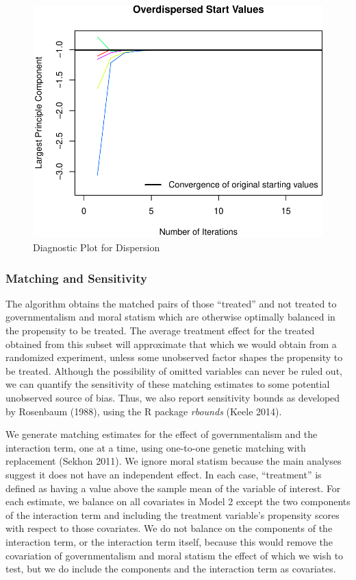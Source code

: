 \documentclass[12pt,]{article}
\begin{document}
\begin{figure}[htbp]
\centering
\includegraphics{figures/missing6-1.pdf}
\caption{Diagnostic Plot for Dispersion}
\end{figure}

\subsubsection{Matching and Sensitivity}\label{matching-and-sensitivity}

The algorithm obtains the matched pairs of those ``treated'' and not
treated to governmentalism and moral statism which are otherwise
optimally balanced in the propensity to be treated. The average
treatment effect for the treated obtained from this subset will
approximate that which we would obtain from a randomized experiment,
unless some unobserved factor shapes the propensity to be treated.
Although the possibility of omitted variables can never be ruled out, we
can quantify the sensitivity of these matching estimates to some
potential unobserved source of bias. Thus, we also report sensitivity
bounds as developed by Rosenbaum (1988), using the R package \emph{rbounds} (Keele 2014).

We generate matching estimates for the effect of governmentalism and the
interaction term, one at a time, using one-to-one genetic matching with
replacement (Sekhon 2011). We ignore moral statism because the main analyses suggest
it does not have an independent effect. In each case, ``treatment'' is
defined as having a value above the sample mean of the variable of
interest. For each estimate, we balance on all covariates in Model 2
except the two components of the interaction term and including the
treatment variable's propensity scores with respect to those covariates.
We do not balance on the components of the interaction term, or the
interaction term itself, because this would remove the covariation of
governmentalism and moral statism the effect of which we wish to test,
but we do include the components and the interaction term as covariates.
\end{document}
